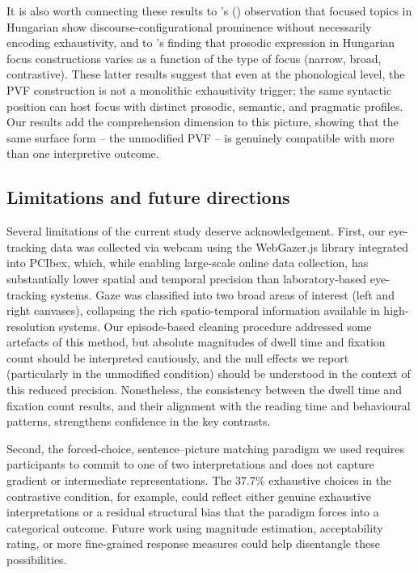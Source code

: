 \documentclass[a4paper, ruler]{CUP-JNL-LIN}%
\begin{document}
It is also worth connecting these results to \citeauthor{gecseg_2020_focused}'s (\citeyear{gecseg_2020_focused}) observation that focused topics in Hungarian show discourse-configurational prominence without necessarily encoding exhaustivity, and to \citet{genzel_2015_prosodic}'s finding that prosodic expression in Hungarian focus constructions varies as a function of the type of focus (narrow, broad, contrastive). These latter results suggest that even at the phonological level, the PVF construction is not a monolithic exhaustivity trigger; the same syntactic position can host focus with distinct prosodic, semantic, and pragmatic profiles. Our results add the comprehension dimension to this picture, showing that the same surface form -- the unmodified PVF -- is genuinely compatible with more than one interpretive outcome.



\subsection{Limitations and future directions}

Several limitations of the current study deserve acknowledgement. First, our eye-tracking data was collected via webcam using the WebGazer.js library integrated into PCIbex, which, while enabling large-scale online data collection, has substantially lower spatial and temporal precision than laboratory-based eye-tracking systems. Gaze was classified into two broad areas of interest (left and right canvases), collapsing the rich spatio-temporal information available in high-resolution systems. Our episode-based cleaning procedure addressed some artefacts of this method, but absolute magnitudes of dwell time and fixation count should be interpreted cautiously, and the null effects we report (particularly in the unmodified condition) should be understood in the context of this reduced precision. Nonetheless, the consistency between the dwell time and fixation count results, and their alignment with the reading time and behavioural patterns, strengthens confidence in the key contrasts.

Second, the forced-choice, sentence--picture matching paradigm we used requires participants to commit to one of two interpretations and does not capture gradient or intermediate representations. The 37.7\% exhaustive choices in the contrastive condition, for example, could reflect either genuine exhaustive interpretations or a residual structural bias that the paradigm forces into a categorical outcome. Future work using magnitude estimation, acceptability rating, or more fine-grained response measures could help disentangle these possibilities.
\end{document}
